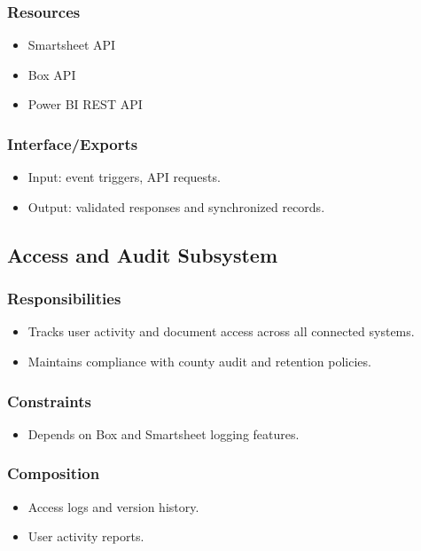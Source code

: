 \documentclass[12pt]{article}
\begin{document}
\subsubsection{Resources}
\begin{itemize}[nosep]
  \item Smartsheet API
  \item Box API
  \item Power BI REST API
\end{itemize}

\subsubsection{Interface/Exports}
\begin{itemize}[nosep]
  \item Input: event triggers, API requests.
  \item Output: validated responses and synchronized records.
\end{itemize}

\subsection{Access and Audit Subsystem}
\subsubsection{Responsibilities}
\begin{itemize}[nosep]
  \item Tracks user activity and document access across all connected systems.
  \item Maintains compliance with county audit and retention policies.
\end{itemize}

\subsubsection{Constraints}
\begin{itemize}[nosep]
  \item Depends on Box and Smartsheet logging features.
\end{itemize}

\subsubsection{Composition}
\begin{itemize}[nosep]
  \item Access logs and version history.
  \item User activity reports.
\end{itemize}
\end{document}

